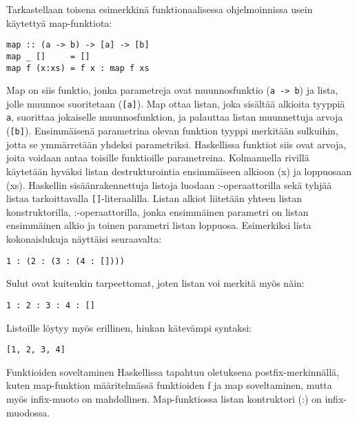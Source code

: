 \documentclass[grading, english, finnish]{tktltiki2}
\theoremstyle{definition}
\theoremstyle{remark}
\begin{document}
Tarkastellaan toisena esimerkkinä funktionaalisessa ohjelmoinnissa usein käytettyä map-funktiota:
\begin{lstlisting}
map :: (a -> b) -> [a] -> [b]
map _ []     = []
map f (x:xs) = f x : map f xs
\end{lstlisting}
Map on siis funktio, jonka parametreja ovat muunnosfunktio (\lstinline|a -> b|) ja lista, jolle muunnos suoritetaan (\lstinline|[a]|). Map ottaa listan, joka sisältää alkioita tyyppiä \lstinline|a|, suorittaa jokaiselle muunnosfunktion, ja palauttaa listan muunnettuja arvoja (\lstinline|[b]|). Ensimmäisenä parametrina olevan funktion tyyppi merkitään sulkuihin, jotta se ymmärretään yhdeksi parametriksi. Haskellissa funktiot siis ovat arvoja, joita voidaan antaa toisille funktioille parametreina. Kolmannella rivillä käytetään hyväksi listan destrukturointia ensimmäiseen alkioon (x) ja loppuosaan (xs). Haskellin sisäänrakennettuja listoja luodaan :-operaattorilla sekä tyhjää listaa tarkoittavalla \lstinline|[]|-literaalilla. Listan alkiot liitetään yhteen listan konstruktorilla, :-operaattorilla, jonka ensimmäinen parametri on listan ensimmäinen alkio ja toinen parametri listan loppuosa. Esimerkiksi lista kokonaislukuja näyttäisi seuraavalta:
\begin{lstlisting}
1 : (2 : (3 : (4 : [])))
\end{lstlisting}
Sulut ovat kuitenkin tarpeettomat, joten listan voi merkitä myös näin:
\begin{lstlisting}
1 : 2 : 3 : 4 : []
\end{lstlisting}
Listoille löytyy myös erillinen, hiukan kätevämpi syntaksi:
\begin{lstlisting}
[1, 2, 3, 4]
\end{lstlisting}

Funktioiden soveltaminen Haskellissa tapahtuu oletuksena postfix-merkinnällä, kuten map-funktion määritelmässä funktioiden f ja map soveltaminen, mutta myös infix-muoto on mahdollinen. Map-funktiossa listan kontruktori (:) on infix-muodossa.



%
%
% 
%

\newpage







% 
\end{document}
